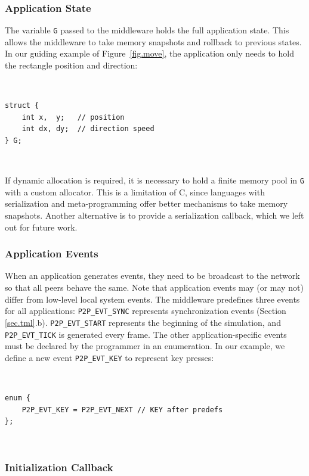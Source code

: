 \documentclass[10pt,journal,compsoc]{IEEEtran}
\newcommand{\code}[1]  {\texttt{\small{#1}}}
\begin{document}
\subsubsection{Application State}
\label{sec.tml.api.state}

The variable \code{G} passed to the middleware holds the full application
state.
This allows the middleware to take memory snapshots and rollback to previous
states.
In our guiding example of Figure~\ref{fig.move}, the application only needs to
hold the rectangle position and direction:

{\footnotesize
~
\begin{verbatim}
struct {
    int x,  y;   // position
    int dx, dy;  // direction speed
} G;
\end{verbatim}
~
}

If dynamic allocation is required, it is necessary to hold a finite memory
pool in \code{G} with a custom allocator.
This is a limitation of C, since languages with serialization and
meta-programming offer better mechanisms to take memory snapshots.
Another alternative is to provide a serialization callback, which we left out
for future work.

\subsubsection{Application Events}
\label{sec.tml.api.events}

When an application generates events, they need to be broadcast to the network
so that all peers behave the same.
Note that application events may (or may not) differ from low-level local
system events.
%
The middleware predefines three events for all applications:
    \code{P2P\_EVT\_SYNC} represents synchronization events
        (Section \ref{sec.tml}.b).
    \code{P2P\_EVT\_START} represents the beginning of the simulation, and
    \code{P2P\_EVT\_TICK} is generated every frame.
The other application-specific events must be declared by the programmer in an
enumeration.
In our example, we define a new event \code{P2P\_EVT\_KEY} to represent key
presses:

{\footnotesize
~
\begin{verbatim}
enum {
    P2P_EVT_KEY = P2P_EVT_NEXT // KEY after predefs
};
\end{verbatim}
~
}

\subsubsection{Initialization Callback}
\label{sec.tml.api.cb_ini}
\end{document}
